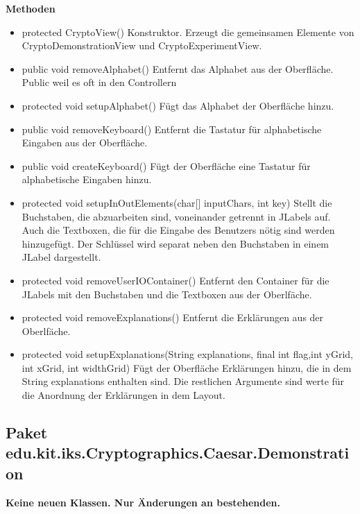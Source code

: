 \documentclass{article}
\begin{document}
    \textbf{Methoden}
      \begin{itemize}
        \item protected CryptoView()\newline
              Konstruktor. Erzeugt die gemeinsamen Elemente von CryptoDemonstrationView und CryptoExperimentView.
        \item public void removeAlphabet()\newline
              Entfernt das Alphabet aus der Oberfläche. Public weil es oft in den Controllern
        \item protected void setupAlphabet()\newline
              Fügt das Alphabet der Oberfläche hinzu.
        \item public void removeKeyboard()\newline
              Entfernt die Tastatur für alphabetische Eingaben aus der Oberfläche.
        \item public void createKeyboard()\newline
              Fügt der Oberfläche eine Tastatur für alphabetische Eingaben hinzu.
        \item protected void setupInOutElements(char[] inputChars, int key)\newline
              Stellt die Buchstaben, die abzuarbeiten sind, voneinander getrennt in JLabels auf. 
              Auch die Textboxen, die für die Eingabe des Benutzers nötig sind werden hinzugefügt.
              Der Schlüssel wird separat neben den Buchstaben in einem JLabel dargestellt.
        \item protected void removeUserIOContainer()\newline
              Entfernt den Container für die JLabels mit den Buchstaben und die Textboxen aus der Oberlfäche.
        \item protected void removeExplanations()\newline
              Entfernt die Erklärungen aus der Oberlfäche.
	\item protected void setupExplanations(String explanations, final int flag,int yGrid, int xGrid, int widthGrid)\newline
	      Fügt der Oberfläche Erklärungen hinzu, die in dem String explanations enthalten sind.
	      Die restlichen Argumente sind werte für die Anordnung der Erklärungen in dem Layout.      
      \end{itemize}

  \subsection{Paket edu.kit.iks.Cryptographics.Caesar.Demonstration}
   \textbf{Keine neuen Klassen. Nur Änderungen an bestehenden.}
\end{document}
